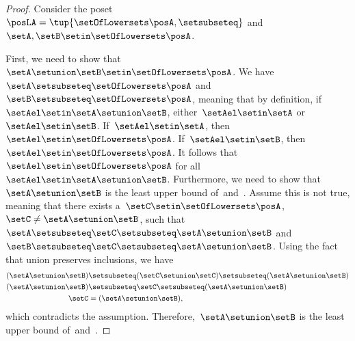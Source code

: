 \begin{proof}
    Consider the poset~$\posLA=\tup{\setOfLowersets \posA, {{\setsubseteq}}}$ and~$\setA,\setB\setin \setOfLowersets \posA$.

    First, we need to show that~$\setA\setunion \setB\setin \setOfLowersets \posA$.
    We have~$\setA \setsubseteq \setOfLowersets \posA$ and~$\setB\setsubseteq \setOfLowersets \posA$, meaning that by definition, if~$\setAel\setin \setA\setunion \setB$, either~$\setAel\setin \setA$ or~$\setAel\setin \setB$.
    If~$\setAel\setin \setA$, then~$\setAel\setin \setOfLowersets \posA$.
    If~$\setAel\setin \setB$, then~$\setAel\setin \setOfLowersets \posA$.
    It follows that~$\setAel\setin \setOfLowersets \posA$ for all~$\setAel\setin \setA\setunion \setB$.
    Furthermore, we need to show that~$\setA\setunion \setB$ is the least upper bound of~\setA and~\setB.
    Assume this is not true, meaning that there exists a~$\setC\setin \setOfLowersets \posA$,~$\setC\neq \setA\setunion \setB$, such that~$\setA\setsubseteq \setC\setsubseteq \setA\setunion \setB$ and~$\setB\setsubseteq \setC\setsubseteq \setA\setunion \setB$.
    Using the fact that union preserves inclusions, we have
    \begin{equation}
        \begin{aligned}
            (\setA\setunion \setB)
                                   & \setsubseteq (\setC \setunion \setC) \setsubseteq (\setA \setunion \setB) \\
            (\setA\setunion \setB) & \setsubseteq \setC \setsubseteq (\setA\setunion \setB) \\
            \setC                  & = (\setA\setunion \setB),
        \end{aligned}
    \end{equation}
    which contradicts the assumption.
    Therefore,~$\setA\setunion \setB$ is the least upper bound of~\setA and~\setB.


\end{proof}
